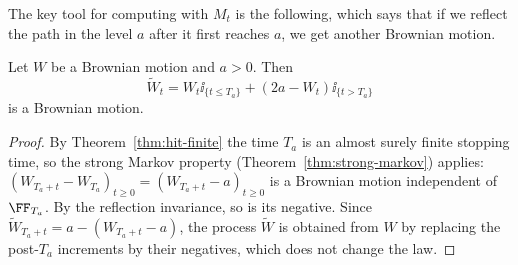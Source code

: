 The key tool for computing with $M_t$ is the following, which says that if we reflect the path in the level $a$ after it first reaches $a$, we get another Brownian motion.

\begin{theorem}\label{thm:reflection}
	Let $W$ be a Brownian motion and $a > 0$. Then
	$$
	\tilde W_t = W_t\ii_{\{t\leq T_a\}} + (2a-W_t)\ii_{\{t> T_a\}}
	$$
	is a Brownian motion.
\end{theorem}

\begin{proof}
	By Theorem~\ref{thm:hit-finite} the time $T_a$ is an almost surely finite stopping time, so the strong Markov property (Theorem~\ref{thm:strong-markov}) applies: $(W_{T_a+t}-W_{T_a})_{t\geq0} = (W_{T_a+t}-a)_{t\geq0}$ is a Brownian motion independent of $\FF_{T_a}$. By the reflection invariance, so is its negative. Since $\tilde W_{T_a+t} = a - (W_{T_a+t}-a)$, the process $\tilde W$ is obtained from $W$ by replacing the post-$T_a$ increments by their negatives, which does not change the law.
\end{proof}

